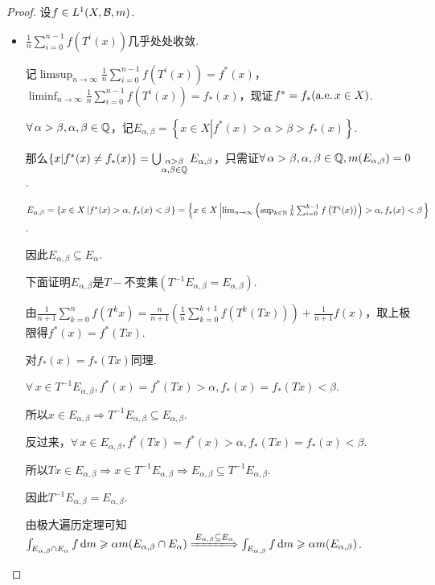 \begin{proof}
    设$f\in L^1(X,\mathcal{B},m)$.\par
    \begin{itemize}
        \item $\frac{1}{n}\sum_{i=0}^{n-1}{f\left(T^i(x)\right)}$几乎处处收敛.\par
        记$\limsup_{n\to\infty}{\frac{1}{n}\sum_{i=0}^{n-1}{f\left(T^i(x)\right)}}=f^*(x)$，$\liminf_{n\to\infty}{\frac{1}{n}\sum_{i=0}^{n-1}{f\left(T^i(x)\right)}}=f_*(x)$，现证$f^*=f_*(\operatorname{\text{a.e.}} x\in X)$.\par
        $\forall\,\alpha>\beta,\alpha,\beta\in\mathbb{Q}$，记$E_{\alpha,\beta}=\left\{x\in X \left|f^*(x)>\alpha>\beta>f_*(x) \right.\right\}$.\par
        那么$\left\{x|f^*(x)\neq f_*(x)\right\}=\bigcup_{\substack{\alpha>\beta \\ \alpha,\beta\in\mathbb{Q}}}{E_{\alpha,\beta}}$，只需证$\forall\,\alpha>\beta,\alpha,\beta\in\mathbb{Q},m(E_{\alpha,\beta})=0$. \par
        $E_{\alpha,\beta}=\left\{x\in X\left|f^*(x)>\alpha,f_*(x)<\beta\right.\right\}=\left\{x\in X\left|\lim_{n\to\infty}\left(\sup_{k\in\mathbb{N}}{\frac{1}{k}\sum_{i=0}^{k-1}{f\left(T^i(x)\right)}}\right)>\alpha,f_*(x)<\beta\right.\right\}$.\par
        因此$E_{\alpha,\beta}\subseteq E_\alpha$.\par
        下面证明$E_{\alpha,\beta}$是$T-$不变集$(T^{-1}E_{\alpha,\beta}=E_{\alpha,\beta})$.\par
        由$\frac{1}{n+1}\sum_{k=0}^n{f \left(T^k{x}\right)}=\frac{n}{n+1}\left(\frac{1}{n}\sum_{k=0}^{k+1}{f \left(T^k(Tx)\right)}\right)+\frac{1}{n+1}f(x)$，取上极限得$f^*(x)=f^*(Tx)$.\par
        对$f_*(x)=f_*(Tx)$同理.\par
        $\forall\, x\in T^{-1}E_{\alpha,\beta},f^*(x)=f^*(Tx)>\alpha,f_*(x)=f_*(Tx)<\beta$.\par
        所以$x\in E_{\alpha,\beta}\Rightarrow T^{-1}E_{\alpha,\beta}\subseteq E_{\alpha,\beta}$.\par
        反过来，$\forall\, x\in E_{\alpha,\beta},f^*(Tx)=f^*(x)>\alpha,f_*(Tx)=f_*(x)<\beta$.\par
        所以$Tx\in E_{\alpha,\beta}\Rightarrow x\in T^{-1}E_{\alpha,\beta}\Rightarrow E_{\alpha,\beta}\subseteq T^{-1}E_{\alpha,\beta}$.\par
        因此$T^{-1}E_{\alpha,\beta}=E_{\alpha,\beta}$.\par
        由极大遍历定理可知$\int_{E_{\alpha,\beta}\cap E_\alpha}{f}\d m\geq \alpha m(E_{\alpha,\beta}\cap E_\alpha)\xLongrightarrow{E_{\alpha,\beta}\subseteq E_\alpha}\int_{E_{\alpha,\beta}}{f}\d m\geq \alpha m(E_{\alpha,\beta})$.\par

\end{itemize}
\end{proof}
